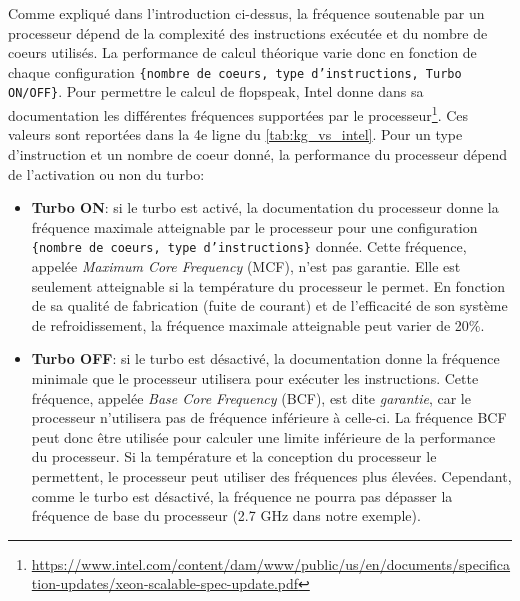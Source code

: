     Comme expliqué dans l'introduction ci-dessus, la fréquence  soutenable par un processeur dépend de la complexité des instructions exécutée et du nombre de coeurs utilisés. La performance de calcul théorique varie donc en fonction de chaque configuration \texttt{\{nombre de coeurs, type d'instructions, Turbo ON/OFF\}}. Pour permettre le calcul de \gls{flopspeak}, Intel donne dans sa documentation les différentes fréquences supportées par le processeur\footnote{\url{https://www.intel.com/content/dam/www/public/us/en/documents/specification-updates/xeon-scalable-spec-update.pdf}}. Ces valeurs sont reportées dans la 4e ligne du \autoref{tab:kg_vs_intel}. Pour un type d'instruction et un nombre de coeur donné, la performance du processeur dépend de l'activation ou non du turbo:
    \begin{itemize}
        
        
        \item \textbf{Turbo ON}: si le turbo est activé, la documentation du processeur donne la fréquence maximale atteignable par le processeur pour une configuration \texttt{\{nombre de coeurs, type d'instructions\}} donnée. Cette fréquence, appelée \textit{Maximum Core Frequency} (MCF), n'est pas garantie. Elle est seulement atteignable si la température du processeur le permet. En fonction de sa qualité de fabrication (fuite de courant) et de l'efficacité de son système de refroidissement, la fréquence maximale atteignable peut varier de 20\%.
        
        \item \textbf{Turbo OFF}: si le turbo est désactivé, la documentation donne la fréquence minimale que le processeur utilisera pour exécuter les instructions. Cette fréquence, appelée \textit{Base Core Frequency} (BCF), est dite \textit{garantie}, car le processeur n'utilisera pas de fréquence inférieure à celle-ci.  La fréquence BCF peut donc être utilisée pour calculer une limite inférieure de la performance du processeur. Si la température et la conception du processeur le permettent, le processeur peut utiliser des fréquences plus élevées. Cependant, comme le turbo est désactivé, la fréquence ne pourra pas dépasser la fréquence de base du processeur (2.7 GHz dans notre exemple).
        
    \end{itemize}
    
